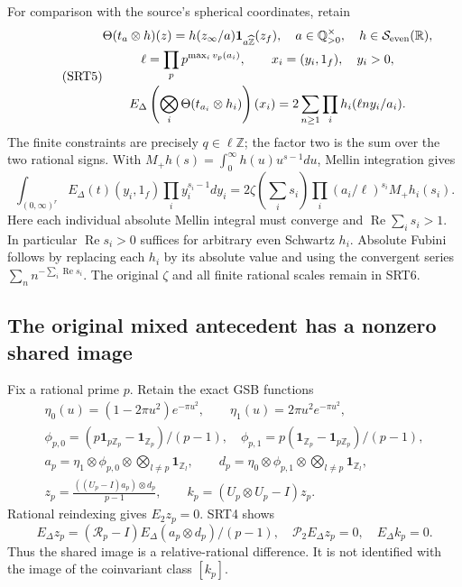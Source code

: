 For comparison with the source's spherical coordinates, retain
\begin{equation}\tag{SRT5}
\begin{gathered}
\Theta(t_a\otimes h)(z)=h(z_\infty/a)
            \mathbf1_{a\widehat{\mathbb Z}}(z_f),\quad a\in\mathbb Q_{>0}^\times,
\quad h\in\mathcal S_{\rm even}(\mathbb R),\\
\ell=\prod_p p^{\max_i v_p(a_i)},\qquad x_i=(y_i,1_f),\quad y_i>0,\\
E_\Delta\left(\bigotimes_i\Theta(t_{a_i}\otimes h_i)\right)(x_i)
 =2\sum_{n\ge1}\prod_i h_i(\ell n y_i/a_i).
\end{gathered}
\end{equation}
The finite constraints are precisely $q\in\ell\mathbb Z$; the factor
two is the sum over the two rational signs. With
$M_+h(s)=\int_0^\infty h(u)u^{s-1}du$, Mellin integration gives
\begin{equation}\tag{SRT6}
\int_{(0,\infty)^r}E_\Delta(t)(y_i,1_f)
       \prod_i y_i^{s_i-1}dy_i
 =2\zeta\left(\sum_i s_i\right)
       \prod_i(a_i/\ell)^{s_i}M_+h_i(s_i).
\end{equation}
Here each individual absolute Mellin integral must converge and
$\operatorname{Re}\sum_i s_i>1$. In particular
$\operatorname{Re}s_i>0$ suffices for arbitrary even Schwartz $h_i$.
Absolute Fubini follows by replacing each $h_i$ by its absolute value
and using the convergent series $\sum_n n^{-\sum_i\operatorname{Re}s_i}$.
The original $\zeta$ and all finite rational scales remain in SRT6.

\subsection{The original mixed antecedent has a nonzero shared image}
Fix a rational prime $p$. Retain the exact GSB functions
\begin{equation}\tag{SRT7}
\begin{gathered}
\eta_0(u)=(1-2\pi u^2)e^{-\pi u^2},\qquad
\eta_1(u)=2\pi u^2e^{-\pi u^2},\\
\phi_{p,0}=(p\mathbf1_{p\mathbb Z_p}-\mathbf1_{\mathbb Z_p})/(p-1),
\quad
\phi_{p,1}=p(\mathbf1_{\mathbb Z_p}-\mathbf1_{p\mathbb Z_p})/(p-1),\\
a_p=\eta_1\otimes\phi_{p,0}\otimes
          \bigotimes_{l\ne p}\mathbf1_{\mathbb Z_l},\qquad
d_p=\eta_0\otimes\phi_{p,1}\otimes
          \bigotimes_{l\ne p}\mathbf1_{\mathbb Z_l},\\
z_p=\frac{((U_p-I)a_p)\otimes d_p}{p-1},\qquad
k_p=(U_p\otimes U_p-I)z_p.
\end{gathered}
\end{equation}
Rational reindexing gives $E_2z_p=0$. SRT4 shows
\begin{equation}\tag{SRT8}
E_\Delta z_p=(\mathcal R_p-I)E_\Delta(a_p\otimes d_p)/(p-1),
\quad \mathcal P_2 E_\Delta z_p=0,\quad E_\Delta k_p=0.
\end{equation}
Thus the shared image is a relative-rational difference. It is not
identified with the image of the coinvariant class $[k_p]$.

